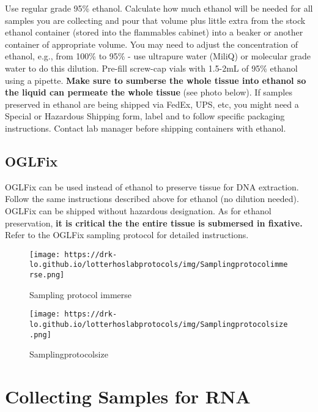 \documentclass[
  letterpaper,
  DIV=11,
  numbers=noendperiod]{scrreprt}
\begin{document}
Use regular grade 95\% ethanol. Calculate how much ethanol will be
needed for all samples you are collecting and pour that volume plus
little extra from the stock ethanol container (stored into the
flammables cabinet) into a beaker or another container of appropriate
volume. You may need to adjust the concentration of ethanol, e.g., from
100\% to 95\% - use ultrapure water (MiliQ) or molecular grade water to
do this dilution. Pre-fill screw-cap vials with 1.5-2mL of 95\% ethanol
using a pipette. \textbf{Make sure to sumberse the whole tissue into
ethanol so the liquid can permeate the whole tissue} (see photo below).
If samples preserved in ethanol are being shipped via FedEx, UPS, etc,
you might need a Special or Hazardous Shipping form, label and to follow
specific packaging instructions. Contact lab manager before shipping
containers with ethanol.

\hypertarget{oglfix}{%
\section*{\texorpdfstring{\textbf{OGLFix}}{OGLFix}}\label{oglfix}}

OGLFix can be used instead of ethanol to preserve tissue for DNA
extraction. Follow the same instructions described above for ethanol (no
dilution needed). OGLFix can be shipped without hazardous designation.
As for ethanol preservation, \textbf{it is critical the the entire
tissue is submersed in fixative.} Refer to the OGLFix sampling protocol
for detailed instructions.

\begin{figure}

{\centering \texttt{[image: https://drk-lo.github.io/lotterhoslabprotocols/img/Samplingprotocolimmerse.png]}

}

\caption{Sampling protocol immerse}

\end{figure}

\begin{figure}

{\centering \texttt{[image: https://drk-lo.github.io/lotterhoslabprotocols/img/Samplingprotocolsize.png]}

}

\caption{Samplingprotocolsize}

\end{figure}

\hypertarget{collecting-samples-for-rna}{%
\chapter{Collecting Samples for RNA}\label{collecting-samples-for-rna}}
\end{document}

